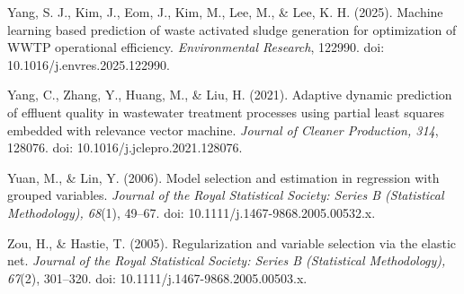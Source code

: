 \documentclass[a4paper,fleqn]{cas-sc}
\begin{document}
\noindent Yang, S. J., Kim, J., Eom, J., Kim, M., Lee, M., \& Lee, K. H. (2025). Machine learning based prediction of waste activated sludge generation for optimization of WWTP operational efficiency. \textit{Environmental Research}, 122990. doi: 10.1016/j.envres.2025.122990.

\noindent Yang, C., Zhang, Y., Huang, M., \& Liu, H. (2021). Adaptive dynamic prediction of effluent quality in wastewater treatment processes using partial least squares embedded with relevance vector machine. \textit{Journal of Cleaner Production, 314}, 128076. doi: 10.1016/j.jclepro.2021.128076.

\noindent Yuan, M., \& Lin, Y. (2006). Model selection and estimation in regression with grouped variables. \textit{Journal of the Royal Statistical Society: Series B (Statistical Methodology), 68}(1), 49--67. doi: 10.1111/j.1467-9868.2005.00532.x.

\noindent Zou, H., \& Hastie, T. (2005). Regularization and variable selection via the elastic net. \textit{Journal of the Royal Statistical Society: Series B (Statistical Methodology), 67}(2), 301--320. doi: 10.1111/j.1467-9868.2005.00503.x.
\end{document}
